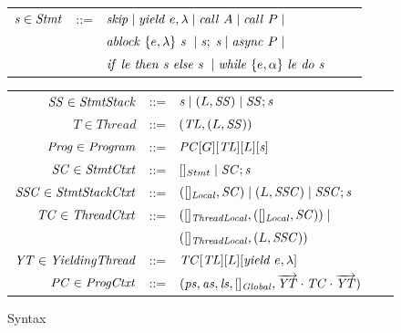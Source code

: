 \begin{figure}
\setlength{\tabcolsep}{3pt}
\begin{tabular}{rclcl}
$\mathit{s} \in \mathit{Stmt}$ &::= & $\mathit{skip} \mid \mathit{yield}\ e,\lambda \mid \mathit{call}\ A \mid \mathit{call}\ P \mid$ \\
                  & & $\mathit{ablock}\ {\{e,\lambda\}}\ {\mathit{s}}\  \mid \mathit{s};\;\mathit{s} \mid \mathit{async}\ P \mid$\\
                  & & ${\mathit{if}\ {\mathit{le}}\ }{\mathit{then}\ {\mathit{s}}\ }{\mathit{else}\ {\mathit{s}}\ } \mid \mathit{while}\ \{{e,\alpha}\}\ {{\mathit{le}}\ } \mathit{do}\ {{\mathit{s}}\ }$ \vspace{6pt} \\
\end{tabular}
\begin{tabular}{rclcl}
$\mathit{SS} \in \mathit{StmtStack}$ &::= & $\mathit{s} \mid (L,\mathit{SS}) \mid \mathit{SS};\mathit{s}$ \\
$T \in \mathit{Thread}$ &::= &$(\mathit{TL}, (L, \mathit{SS}))$ \\
$\mathit{Prog} \in \mathit{Program}$ &::= & $\mathit{PC}[G][\mathit{TL}][L][\mathit{s}]$ \vspace{6pt} \\
$\mathit{SC} \in \mathit{StmtCtxt}$ &::= &$[]_{Stmt} \mid \mathit{SC};\mathit{s}$ \\
$\mathit{SSC} \in \mathit{StmtStackCtxt}$ &::= & $([]_{\mathit{Local}}, \mathit{SC}) \mid (L,\mathit{SSC}) \mid \mathit{SSC};\mathit{s}$ \\
$\mathit{TC} \in \mathit{ThreadCtxt}$ &::= &$([]_{\mathit{ThreadLocal}}, ([]_{\mathit{Local}}, \mathit{SC})) \mid$ \\
 & &$([]_{\mathit{ThreadLocal}}, (L, \mathit{SSC}))$ \\
$\mathit{YT} \in \mathit{YieldingThread}$ &::= &$\mathit{TC}[\mathit{TL}][L][\mathit{yield}\ e,\lambda]$ \\
$\mathit{PC} \in \mathit{ProgCtxt}$ &::= & $(\mathit{ps}, \mathit{as}, \mathit{ls}, []_{\mathit{Global}}, \overrightarrow{\mathit{YT}} \cdot \mathit{TC} \cdot \overrightarrow{\mathit{YT}})$
\end{tabular}
\caption{Syntax}
\label{fig:syntax}
\end{figure}

